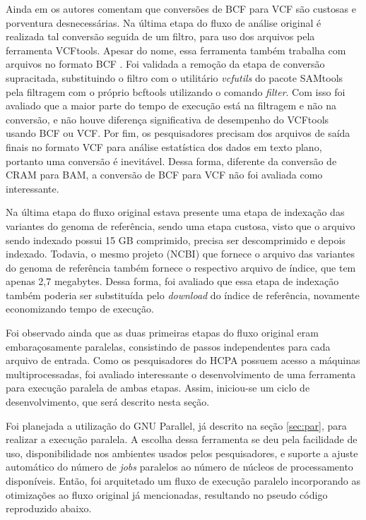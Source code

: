 \documentclass[cic,tc]{iiufrgs}
\begin{document}
Ainda em \cite{danecek2021twelve} os autores comentam que conversões de BCF
para VCF são custosas e porventura desnecessárias. Na última etapa do fluxo de
análise original é realizada tal conversão seguida de um filtro, para uso dos
arquivos pela ferramenta VCFtools. Apesar do nome, essa ferramenta também
trabalha com arquivos no formato BCF \cite{man2015vcftools}. Foi validada a
remoção da etapa de conversão supracitada, substituindo o filtro com o
utilitário \textit{vcfutils} do pacote SAMtools pela filtragem com o próprio
bcftools utilizando o comando \textit{filter}. Com isso foi avaliado que a
maior parte do tempo de execução está na filtragem e não na conversão, e não
houve diferença significativa de desempenho do VCFtools usando BCF ou VCF. Por
fim, os pesquisadores precisam dos arquivos de saída finais no formato VCF para
análise estatística dos dados em texto plano, portanto uma conversão é
inevitável. Dessa forma, diferente da conversão de CRAM para BAM, a conversão
de BCF para VCF não foi avaliada como interessante.

Na última etapa do fluxo original estava presente uma etapa de indexação das
variantes do genoma de referência, sendo uma etapa custosa, visto que o arquivo
sendo indexado possui 15 GB comprimido, precisa ser descomprimido e depois
indexado. Todavia, o mesmo projeto (NCBI) que fornece o arquivo das variantes
do genoma de referência também fornece o respectivo arquivo de índice, que tem
apenas 2,7 megabytes. Dessa forma, foi avaliado que essa etapa de indexação
também poderia ser substituída pelo \textit{download} do índice de referência,
novamente economizando tempo de execução.

Foi observado ainda que as duas primeiras etapas do fluxo original eram
embaraçosamente paralelas, consistindo de passos independentes para cada
arquivo de entrada. Como os pesquisadores do HCPA possuem acesso a máquinas
multiprocessadas, foi avaliado interessante o desenvolvimento de uma ferramenta
para execução paralela de ambas etapas. Assim, iniciou-se um ciclo de
desenvolvimento, que será descrito nesta seção.

Foi planejada a utilização do GNU Parallel, já descrito na seção \ref{sec:par},
para realizar a execução paralela. A escolha dessa ferramenta se deu pela
facilidade de uso, disponibilidade nos ambientes usados pelos pesquisadores, e
suporte a ajuste automático do número de \textit{jobs} paralelos ao número de
núcleos de processamento disponíveis. Então, foi arquitetado um fluxo de
execução paralelo incorporando as otimizações ao fluxo original já mencionadas,
resultando no pseudo código reproduzido abaixo.
\end{document}
